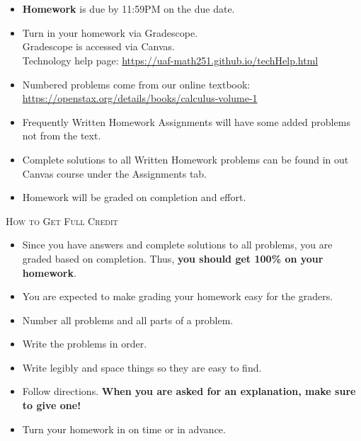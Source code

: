 \documentclass[11pt,fleqn]{article}
\begin{document}
\vspace*{-0.7in}

\begin{center}
  {\large{
  }}\\
\end{center}
\quad\\
\begin{itemize}
\item \textbf{Homework} is due by 11:59PM on the due date. 
\item Turn in your homework via Gradescope. \\
Gradescope is accessed via Canvas. \\
Technology help page: 
\url{https://uaf-math251.github.io/techHelp.html}
\item Numbered problems come from our online textbook:\\ \url{https://openstax.org/details/books/calculus-volume-1}\\
\item Frequently Written Homework Assignments will have some added problems not from the text.
\item Complete solutions to all Written Homework problems can be found in out Canvas course under the Assignments tab. 
\item Homework will be graded on completion and effort. \\
\end{itemize}

\noindent \textsc{How to Get Full Credit}
\begin{itemize}
\item Since you have answers and complete solutions to all problems, you are graded based on completion. Thus, \textbf{you should get 100\% on your homework}.
\item You are expected to make grading your homework easy for the graders.
\item Number all problems and all parts of a problem.
\item Write the problems in order.
\item Write legibly and space things so they are easy to find.
\item Follow directions. \textbf{When you are asked for an explanation, make sure to give one!}
\item Turn your homework in on time or in advance. \\
\end{itemize}
\end{document}
